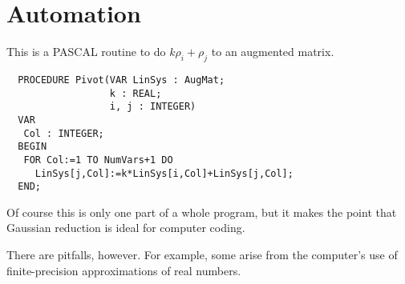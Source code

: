 %
%
%
\section{Automation}

This is a PASCAL routine to do \( k\rho_i+\rho_j \)
to an augmented matrix.
\begin{center}
\begin{verbatim}
  PROCEDURE Pivot(VAR LinSys : AugMat;
                  k : REAL;
                  i, j : INTEGER)
  VAR
   Col : INTEGER;
  BEGIN
   FOR Col:=1 TO NumVars+1 DO
     LinSys[j,Col]:=k*LinSys[i,Col]+LinSys[j,Col];
  END;
\end{verbatim}
\end{center}
Of course this is only one part of a whole program, but it
makes the point that Gaussian reduction is ideal for computer coding.

There are pitfalls, however.
For example, some arise from the computer's use of finite-precision
approximations of real numbers.

